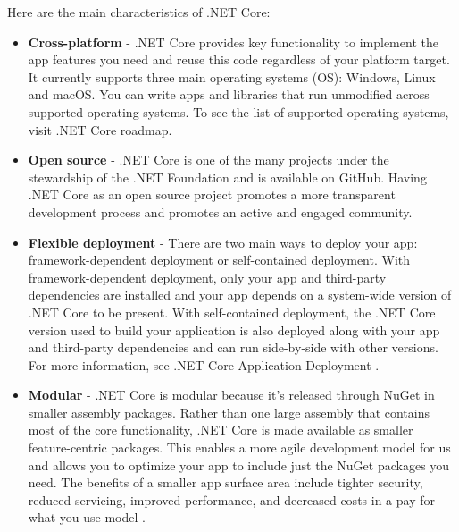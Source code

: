 \documentclass[../thesis.tex]{subfiles}
\begin{document}
Here are the main characteristics of .NET Core:
\newline
    
\begin{itemize}
  \item \textbf{Cross-platform} - .NET Core provides key functionality to implement the app features you need and reuse this code regardless of your platform target. It currently supports three main operating systems (OS): Windows, Linux and macOS. You can write apps and libraries that run unmodified across supported operating systems. To see the list of supported operating systems, visit .NET Core roadmap.
  \newline
    
  \item \textbf{Open source} - .NET Core is one of the many projects under the stewardship of the .NET Foundation and is available on GitHub. Having .NET Core as an open source project promotes a more transparent development process and promotes an active and engaged community.
  \newline
    
  \item \textbf{Flexible deployment} - There are two main ways to deploy your app: framework-dependent deployment or self-contained deployment. With framework-dependent deployment, only your app and third-party dependencies are installed and your app depends on a system-wide version of .NET Core to be present. With self-contained deployment, the .NET Core version used to build your application is also deployed along with your app and third-party dependencies and can run side-by-side with other versions. For more information, see .NET Core Application Deployment \cite{dotnet}.
  \newline
    
  \item \textbf{Modular} - .NET Core is modular because it's released through NuGet in smaller assembly packages. Rather than one large assembly that contains most of the core functionality, .NET Core is made available as smaller feature-centric packages. This enables a more agile development model for us and allows you to optimize your app to include just the NuGet packages you need. The benefits of a smaller app surface area include tighter security, reduced servicing, improved performance, and decreased costs in a pay-for-what-you-use model \cite{dotnet}.
\end{itemize}
    
\end{document}
